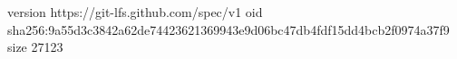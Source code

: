 version https://git-lfs.github.com/spec/v1
oid sha256:9a55d3c3842a62de74423621369943e9d06bc47db4fdf15dd4bcb2f0974a37f9
size 27123
